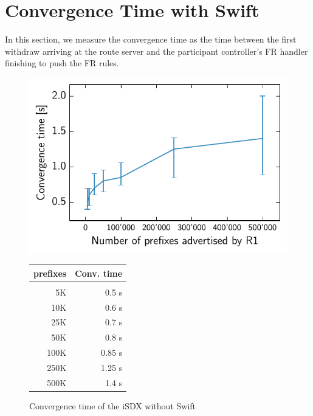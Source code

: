 \section{\label{chapter5:Convergence time with Swift}Convergence Time with Swift}

In this section, we measure the convergence time as the time between the first withdraw arriving at the route server and the participant controller's FR handler finishing to push the FR rules.

\begin{figure}[h]
\centering
\begin{minipage}[t]{.4\textwidth}
\centering
\vspace{0pt}
\includegraphics[scale = 1]{Figures/swift.pdf}
\end{minipage}\hfill
\begin{minipage}[t]{.4\textwidth}
\centering
\vspace{0pt}
\begin{tabular}{@{}rr@{}}
	\\
	prefixes & Conv. time \\
	\hline
	\\
    5K & 0.5 s  \\
    10K & 0.6 s   \\
    25K & 0.7 s   \\
    50K & 0.8 s  \\
    100K & 0.85 s \\
    250K & 1.25 s   \\
    500K & 1.4 s  \\
\end{tabular}
\end{minipage}
\caption{Convergence time of the iSDX without Swift}
\label{fig:withswift}
\end{figure}

